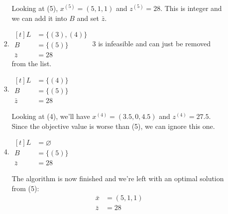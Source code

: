 \documentclass{homework}
\begin{document}
\begin{enumerate}
\begin{enumerate}
\begin{enumerate}
					Looking at (5), $x^{(5)} = (5, 1, 1)$ and $z^{(5)} = 28$. This is integer and we can add it into $B$ and set $\bar{z}$.
					
					\item  $\begin{aligned}[t]
						L & = \{(3), (4)\} \\
						B & = \{(5)\} \\
						\bar{z} & = 28
					\end{aligned}$
					3 is infeasible and can just be removed from the list.
					
					\item $\begin{aligned}[t]
						L & = \{(4)\} \\
						B & = \{(5)\} \\
						\bar{z} & = 28
					\end{aligned}$
				
					Looking at (4), we'll have $x^(4) = (3.5, 0, 4.5)$ and $z^{(4)} = 27.5$. Since the objective value is worse than (5), we can ignore this one.
					
					\item  $\begin{aligned}[t]
						L & = \varnothing\\
						B & = \{(5)\} \\
						\bar{z} & = 28
					\end{aligned}$
					
					The algorithm is now finished and we're left with an optimal solution from (5): \begin{align*}
						\bar{x} & = (5, 1, 1) \\
						\bar{z} & = 28
					\end{align*}
				\end{enumerate}
		\end{enumerate}
	\end{enumerate}
\end{document}

